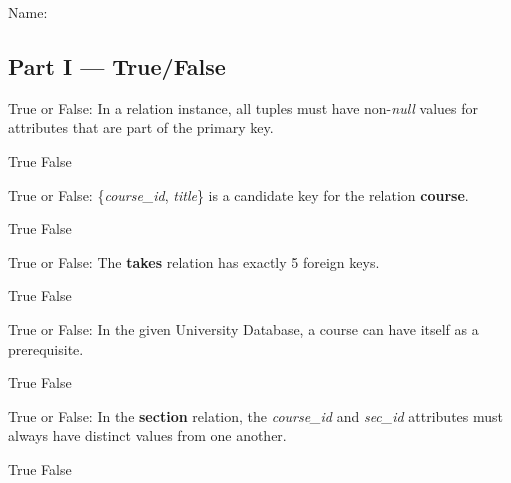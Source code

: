\documentclass[12pt,answers]{exam}
\begin{document}
\noindent Name:\ \makebox[3in]{\hrulefill}
\begin{questions}

\section*{Part I — True/False}

\begin{minipage}{\linewidth}
\question[2]
True or False: In a relation instance, all tuples must have non-\textit{null} values 
for attributes that are part of the primary key.
\begin{checkboxes}
    \CorrectChoice True
    \choice False
\end{checkboxes}
\end{minipage}

\begin{minipage}{\linewidth}
\question[2]
True or False: \{\textit{course\_id}, \textit{title}\} is a candidate key for the relation \textbf{course}.
\begin{checkboxes}
    \choice True
    \CorrectChoice False
\end{checkboxes}
\end{minipage}

\begin{minipage}{\linewidth}
\question[2]
True or False: The \textbf{takes} relation has exactly 5 foreign keys.
\begin{checkboxes}
    \choice True
    \CorrectChoice False
\end{checkboxes}
\end{minipage}

\begin{minipage}{\linewidth}
\question[2]
True or False: In the given University Database, a course can have itself as a prerequisite.
\begin{checkboxes}
    \CorrectChoice True
    \choice False
\end{checkboxes}
\end{minipage}

\begin{minipage}{\linewidth}
\question[2]
True or False: In the \textbf{section} relation, the \textit{course\_id} and \textit{sec\_id} attributes must always have distinct values from one another.
\begin{checkboxes}
    \choice True
    \CorrectChoice False
\end{checkboxes}
\end{minipage}


\end{questions}
\end{document}
